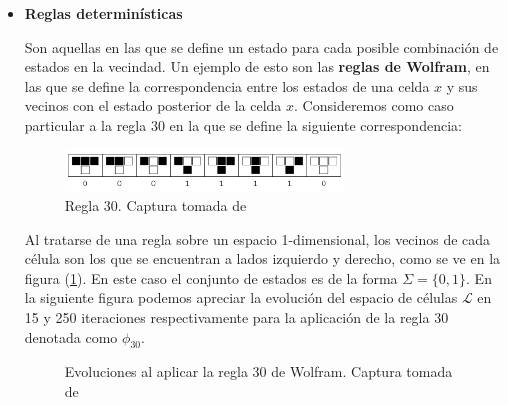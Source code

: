 \begin{itemize}
    \item \textbf{Reglas determinísticas}
    
    Son aquellas en las que se define un estado para cada posible combinación de estados en la vecindad. Un ejemplo de esto son las \textbf{reglas de Wolfram}, en las que se define la correspondencia entre los estados de una celda $x$ y sus vecinos con el estado posterior de la celda $x$. Consideremos como caso particular a la regla 30 en la que se define la siguiente correspondencia:
    
    \begin{figure}[h]
      \centering
        \includegraphics[width=0.7\textwidth]{Imagenes/regla30.PNG}
      \caption{Regla 30. Captura tomada de \cite{rule30}}
      \label{fig:Regla30}
    \end{figure}
    
    \newpage
    
    Al tratarse de una regla sobre un espacio 1-dimensional, los vecinos de cada célula son los que se encuentran a lados izquierdo y derecho, como se ve en la figura (\ref{fig:Regla30}). En este caso el conjunto de estados es de la forma $\Sigma=\{0,1\}$. En la siguiente figura podemos apreciar la evolución del espacio de células $\mathcal{L}$ en 15 y 250 iteraciones respectivamente para la aplicación de la regla 30 denotada como $\phi_{30}$.
    
    \begin{figure}[htbp]\label{fig:regla30en15y250}
        \centering
        \caption{Evoluciones al aplicar la regla 30 de Wolfram. Captura tomada de \cite{rule30}}
    \end{figure}
    

\end{itemize}
